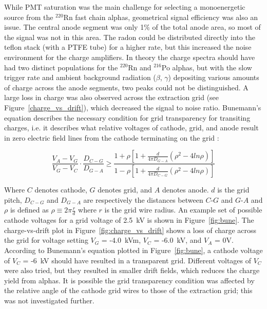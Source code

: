 While \ac{PMT} saturation was the main challenge for selecting a monoenergetic source from the $^{220}$Rn fast chain alphas, geometrical signal efficiency was also an issue. The central anode segment was only 1\% of the total anode area, so most of the signal was not in this area. The radon could be distributed directly into the teflon stack (with a \ac{PTFE} tube) for a higher rate, but this increased the noise environment for the charge amplifiers. In theory the charge spectra should have had two distinct populations for the $^{220}$Rn and $^{216}$Po alphas, but with the slow trigger rate and ambient background radiation ($\beta$, $\gamma$) depositing various amounts of charge across the anode segments, two peaks could not be distinguished. A large loss in charge was also observed across the extraction grid (see Figure~\ref{charge_vs_drift}), which decreased the signal to noise ratio. Bunemann's equation describes the necessary condition for grid transparency for transiting charges, i.e. it describes what relative voltages of cathode, grid, and anode result in zero electric field lines from the cathode terminating on the grid \cite{Bunemann1949} \cite{Bevilacqua2015}:

\begin{equation}
\frac{V_{A} - V_{G}}{V_{G} - V_{C}} \cdot \frac{D_{C-G}}{D_{G-A}} \geqslant \frac{1 + \rho [1 + \frac{d}{4\pi D_{G-A}} (\rho^{2} - 4 ln\rho) ]} {1 - \rho [1 + \frac{d}{4\pi D_{C-G}} (\rho^{2} - 4 ln\rho) ]}
\end{equation}

Where $C$ denotes cathode, $G$ denotes grid, and $A$ denotes anode. $d$ is the grid pitch, $D_{C-G}$ and $D_{G-A}$ are respectively the distances between $C$-$G$ and $G$-$A$ and $\rho$ is defined as $\rho \equiv 2\pi \frac{r}{d}$ where $r$ is the grid wire radius. An example set of possible cathode voltages for a grid voltage of 2.5~kV is shown in Figure~\ref{fig:bune}. The charge-vs-drift plot in Figure~\ref{fig:charge_vs_drift} shows a loss of charge across the grid for voltage setting $V_{G}$ = -4.0~kVm, $V_{C}$ = -6.0~kV, and $V_{A}$ = 0V. According to Bunemann's equation plotted in Figure~\ref{fig:bune}, a cathode voltage of $V_{C}$ = -6~kV should have resulted in a transparent grid. Different voltages of $V_{C}$ were also tried, but they resulted in smaller drift fields, which reduces the charge yield from alphas. It is possible the grid transparency condition was affected by the relative angle of the cathode grid wires to those of the extraction grid; this was not investigated further.

